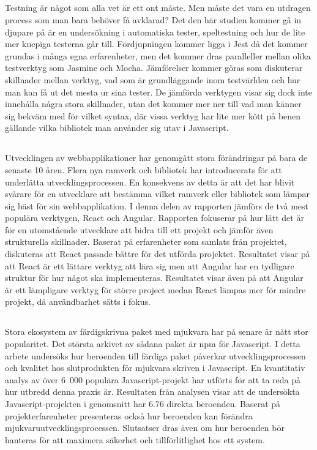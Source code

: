\subsection*{}
Testning är något som alla vet är ett ont måste. Men måste det vara en utdragen process som man bara behöver få avklarad? Det den här studien kommer gå in djupare på är en undersökning i automatiska tester, speltestning och hur de lite mer knepiga testerna går till. Fördjupningen kommer ligga i Jest då det kommer grundas i många egna erfarenheter, men det kommer dras paralleller mellan olika testverktyg som Jasmine och Mocha. Jämförelser kommer göras som diskuterar skillnader mellan verktyg, vad som är grundläggande inom testvärlden och hur man kan få ut det mesta ur sina tester. De jämförda verktygen visar sig dock inte innehålla några stora skillnader, utan det kommer mer ner till vad man känner sig bekväm med för vilket syntax, där vissa verktyg har lite mer kött på benen gällande vilka bibliotek man använder sig utav i Javascript.

\subsection*{}
Utvecklingen av webbapplikationer har genomgått stora förändringar på bara de senaste 10 åren. Flera nya ramverk och bibliotek har introducerats för att underlätta utvecklingsprocessen. En konsekvens av detta är att det har blivit svårare för en utvecklare att bestämma vilket ramverk eller bibliotek som lämpar sig bäst för sin webbapplikation. I denna delen av rapporten jämförs de två mest populära verktygen, React och Angular. Rapporten fokuserar på hur lätt det är för en utomstående utvecklare att bidra till ett projekt och jämför även strukturella skillnader. Baserat på erfarenheter som samlats från projektet, diskuteras att React passade bättre för det utförda projektet. Resultatet visar på att React är ett lättare verktyg att lära sig men att Angular har en tydligare struktur för hur något ska implementeras. Resultatet visar även på att Angular är ett lämpligare verktyg för större project medan React lämpas mer för mindre projekt, då användbarhet sätts i fokus.

\subsection*{}
Stora ekosystem av färdigskrivna paket med mjukvara har på senare år nått stor popularitet. Det största arkivet av sådana paket är npm för Javascript. I detta arbete undersöks hur beroenden till färdiga paket påverkar utvecklingsprocessen och kvalitet hos slutprodukten för mjukvara skriven i Javascript. En kvantitativ analys av över 6~000 populära Javascript-projekt har utförts för att ta reda på hur utbredd denna praxis är. Resultaten från analysen visar att de undersökta Javascript-projekten i genomsnitt har 6.76 direkta beroenden. Baserat på projekterfarenheter presenteras också hur beroenden kan förändra mjukvaruutvecklingsprocessen. Slutsatser dras även om hur beroenden bör hanteras för att maximera säkerhet och tillförlitlighet hos ett system.

